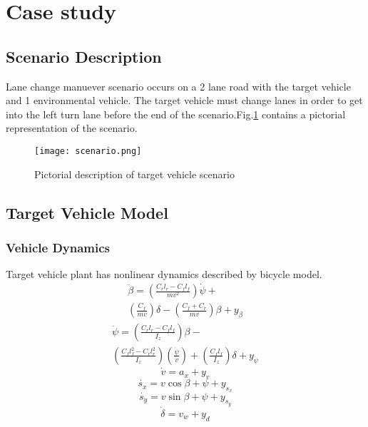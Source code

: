 \section{Case study}
\label{caseStudy}
\subsection{Scenario Description}
Lane change manuever scenario occurs on a 2 lane road with the target vehicle and 1 environmental vehicle. The target vehicle must change lanes in order to get into the left turn lane before the end of the scenario.Fig.\ref{fig:scenario} contains a pictorial representation of the scenario.
\begin{figure}[tb]
	\label{fig:scenario}
		\texttt{[image: scenario.png]}
	\caption{Pictorial description of target vehicle scenario}
\end{figure}
\subsection{Target Vehicle Model}
\subsubsection{Vehicle Dynamics}
Target vehicle plant has nonlinear dynamics described by bicycle model.
	\begin{equation}
	\begin{aligned}
	\ddot{\beta}=\left(\frac{C_rl_r-C_fl_f}{mv^2} \right)\dot{\psi}+\\
	\left(\frac{C_f}{mv} \right)\delta-\left(\frac{C_f+C_r}{mv} \right)\beta+y_{\beta}
	\end{aligned}
	\end{equation}
	\begin{equation}
	\begin{aligned}
	\ddot{\psi}=\left(\frac{C_rl_r-C_fl_f}{I_z} \right)\beta-\\
	\left(\frac{C_fl_f^2-C_rl_r^2}{I_z} \right)\left(\frac{\dot{\psi}}{v} \right)+
	\left(\frac{C_fl_f}{I_z} \right)\delta+y_{\dot{\psi}}
	\end{aligned}
	\end{equation}
	\begin{equation}
	\dot{v}=a_x+y_v
	\end{equation}
	\begin{equation}
	\dot{s_x}=v\cos{\beta+\psi}+y_{s_x}
	\end{equation}
	\begin{equation}
	\dot{s_y}=v\sin{\beta+\psi}+y_{s_y}
	\end{equation}
	\begin{equation}
	\dot{\delta}=v_w+y_d
	\end{equation}
	
